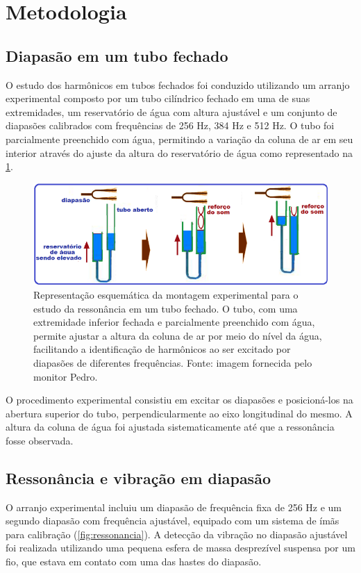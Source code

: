 \section{Metodologia}
\subsection{Diapasão em um tubo fechado}
O estudo dos harmônicos em tubos fechados foi conduzido utilizando um arranjo experimental composto por um tubo cilíndrico fechado em uma de suas extremidades, um reservatório de água com altura ajustável e um conjunto de diapasões calibrados com frequências de 256 Hz, 384 Hz e 512 Hz. O tubo foi parcialmente preenchido com água, permitindo a variação da coluna de ar em seu interior através do ajuste da altura do reservatório de água como representado na \cref{fig:diapasao}.

\begin{figure}[H]
    \centering
    \includegraphics[width=0.50\linewidth]{fig/diapasao.png}
    \caption{Representação esquemática da montagem experimental para o estudo da ressonância em um tubo fechado. O tubo, com uma extremidade inferior fechada e parcialmente preenchido com água, permite ajustar a altura da coluna de ar por meio do nível da água, facilitando a identificação de harmônicos ao ser excitado por diapasões de diferentes frequências. Fonte: imagem fornecida pelo monitor Pedro.}
    \label{fig:diapasao}
\end{figure}

O procedimento experimental consistiu em excitar os diapasões e posicioná-los na abertura superior do tubo, perpendicularmente ao eixo longitudinal do mesmo. A altura da coluna de água foi ajustada sistematicamente até que a ressonância fosse observada.

\subsection{Ressonância e vibração em diapasão}
O arranjo experimental incluiu um diapasão de frequência fixa de 256 Hz e um segundo diapasão com frequência ajustável, equipado com um sistema de ímãs para calibração (\cref{fig:ressonancia}). A detecção da vibração no diapasão ajustável foi realizada utilizando uma pequena esfera de massa desprezível suspensa por um fio, que estava em contato com uma das hastes do diapasão.


